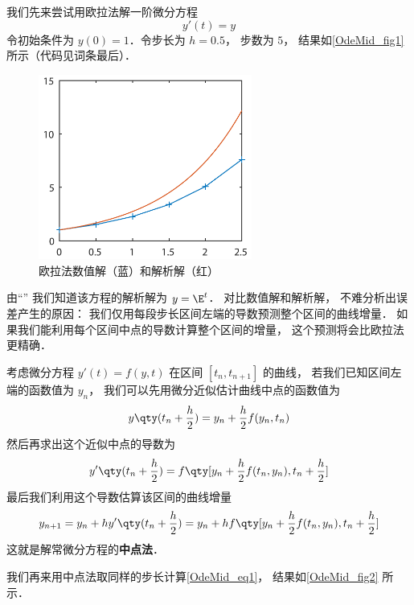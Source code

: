 

我们先来尝试用欧拉法解一阶微分方程
\begin{equation}\label{OdeMid_eq1}
y'(t) = y
\end{equation}
令初始条件为 $y(0) = 1$．令步长为 $h = 0.5$， 步数为 $5$， 结果如\autoref{OdeMid_fig1} 所示（代码见词条最后）．

\begin{figure}[ht]
\centering
\includegraphics[width=7cm]{./figures/OdeMid1.pdf}
\caption{欧拉法数值解（蓝）和解析解（红）} \label{OdeMid_fig1}
\end{figure}

由“”%
我们知道该方程的解析解为 $y = \E^{t}$． 对比数值解和解析解， 不难分析出误差产生的原因： 我们仅用每段步长区间左端的导数预测整个区间的曲线增量． 如果我们能利用每个区间中点的导数计算整个区间的增量， 这个预测将会比欧拉法更精确．

考虑微分方程 $y'(t) = f(y, t)$ 在区间 $[t_n, t_{n+1}]$ 的曲线， 若我们已知区间左端的函数值为 $y_n$， 我们可以先用微分近似估计曲线中点的函数值为
\begin{equation}
y \qty(t_n + \frac h2) = y_n + \frac h2 f(y_n, t_n)
\end{equation}
然后再求出这个近似中点的导数为
\begin{equation}
y' \qty(t_n + \frac h2) = f \qty[y_n + \frac h2 f(t_n, y_n), t_n + \frac h2]
\end{equation}
最后我们利用这个导数估算该区间的曲线增量
\begin{equation}
y_{n+1} = y_n + hy' \qty(t_n + \frac h2) = y_n + h f \qty[y_n + \frac h2 f(t_n, y_n), t_n + \frac h2]
\end{equation}
这就是解常微分方程的\textbf{中点法}．

我们再来用中点法取同样的步长计算\autoref{OdeMid_eq1}， 结果如\autoref{OdeMid_fig2} 所示．

